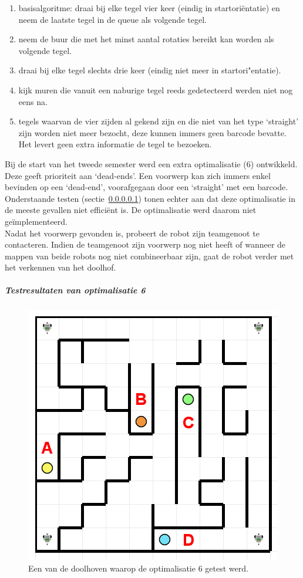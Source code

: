 \documentclass[eind]{penoverslag}
\begin{document}
\begin{enumerate}
\item basisalgoritme: draai bij elke tegel vier keer (eindig in startori\"entatie) en neem de laatste tegel in de queue als volgende tegel.
\item neem de buur die met het minst aantal rotaties bereikt kan worden als volgende tegel.
\item draai bij elke tegel slechts drie keer (eindig niet meer in startori"entatie).
\item kijk muren die vanuit een naburige tegel reeds gedetecteerd werden niet nog eens na.
\item tegels waarvan de vier zijden al gekend zijn en die niet van het type `straight' zijn worden niet meer bezocht, deze kunnen immers geen barcode bevatte. Het levert geen extra informatie de tegel te bezoeken.
\end{enumerate}

Bij de start van het tweede semester werd een extra optimalisatie (6) ontwikkeld. Deze geeft prioriteit aan `dead-ends'. Een voorwerp kan zich immers enkel bevinden op een `dead-end', voorafgegaan door een `straight' met een barcode. Onderstaande testen (sectie~\ref{par:AlgoZoekTest}) tonen echter aan dat deze optimalisatie in de meeste gevallen niet effici\"ent is. De optimalisatie werd daarom niet ge\"implementeerd.\\

Nadat het voorwerp gevonden is, probeert de robot zijn teamgenoot te contacteren. Indien de teamgenoot zijn voorwerp nog niet heeft of wanneer de mappen van beide robots nog niet combineerbaar zijn, gaat de robot verder met het verkennen van het doolhof.

\subparagraph{Testresultaten van optimalisatie 6}
\label{par:AlgoZoekTest}

\begin{figure}[!hb]
\centering
	\includegraphics[scale=0.5]{doolhof3}
	\caption{Een van de doolhoven waarop de optimalisatie 6 getest werd.}
\label{fig:TestDead}
\end{figure}
\end{document}
